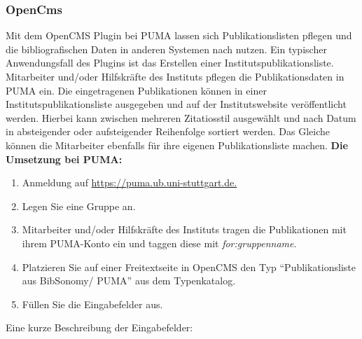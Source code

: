 \subsubsection{OpenCms}
Mit dem OpenCMS Plugin bei PUMA lassen sich Publikationslisten pflegen und die bibliografischen Daten in anderen Systemen nach nutzen. Ein typischer Anwendungsfall des Plugins ist das Erstellen einer Institutspublikationsliste. Mitarbeiter und/oder Hilfskräfte des Instituts pflegen die Publikationsdaten in PUMA ein. Die eingetragenen Publikationen können in einer Institutspublikationsliste ausgegeben und auf der Institutswebsite veröffentlicht werden. Hierbei kann zwischen mehreren Zitatiosstil ausgewählt und nach Datum in absteigender oder aufsteigender Reihenfolge sortiert werden. Das Gleiche können die Mitarbeiter ebenfalls für ihre eigenen Publikationsliste machen.\newline\newline
\textbf{Die Umsetzung bei PUMA:}\newline
\begin{enumerate}
\item  Anmeldung auf \url{https://puma.ub.uni-stuttgart.de.}
\item Legen Sie eine Gruppe an.
\item Mitarbeiter und/oder Hilfskräfte des Instituts tragen die Publikationen mit ihrem PUMA-Konto ein und taggen diese mit \textit{for:gruppenname}.
\item Platzieren Sie auf einer Freitextseite in OpenCMS den Typ \enquote{Publikationsliste aus BibSonomy/ PUMA} aus dem Typenkatalog.
\item Füllen Sie die Eingabefelder aus.
\end{enumerate}
Eine kurze Beschreibung der Eingabefelder:\newline
